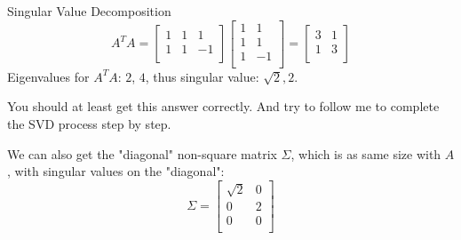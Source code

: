 \documentclass{beamer}
\begin{document}
\begin{frame}{Singular Value Decomposition}
\begin{equation*}
    A^TA=\left[ \begin{matrix}
        1&		1&		1\\
        1&		1&		-1\\
    \end{matrix} \right] \left[ \begin{matrix}
        1&		1\\
        1&		1\\
        1&		-1\\
    \end{matrix} \right] =\left[ \begin{matrix}
        3&		1\\
        1&		3\\
    \end{matrix} \right]
\end{equation*}
Eigenvalues for $A^TA$: $2$, $4$, thus singular value: $\sqrt{2}, 2$.

\vspace{3pt}
You should at least get this answer correctly. And try to follow me to complete the SVD process step by step.

\vspace{3pt}
We can also get the "diagonal" non-square matrix $\varSigma$, which is as same size with $A$, with singular values on the "diagonal":
\begin{equation*}
\varSigma =
    \left[ \begin{matrix}
        \sqrt{2}&		0\\
        0&		2\\
        0&		0\\
    \end{matrix} \right]
\end{equation*}

\end{frame}
\end{document}
